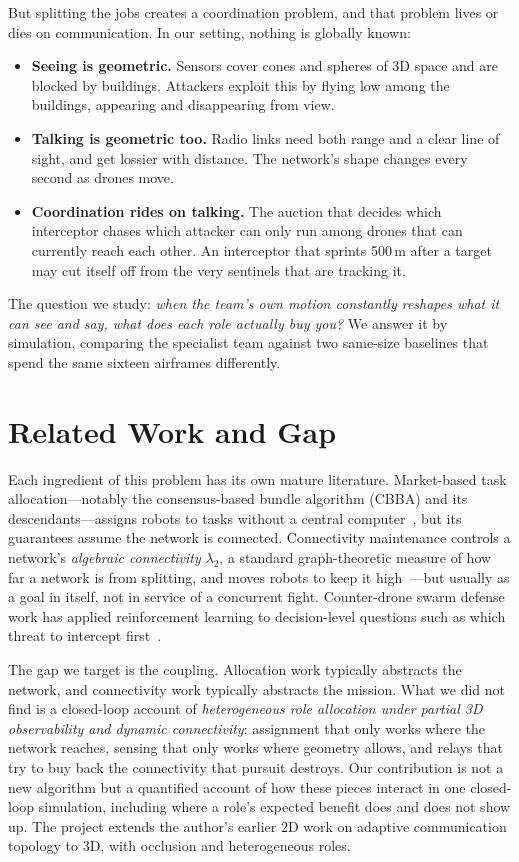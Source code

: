 \documentclass[10pt,twocolumn]{article}
\begin{document}
But splitting the jobs creates a coordination problem, and that problem
lives or dies on communication. In our setting, nothing is globally known:

\begin{itemize}
\item \textbf{Seeing is geometric.} Sensors cover cones and spheres of 3D
space and are blocked by buildings. Attackers exploit this by flying low
among the buildings, appearing and disappearing from view.
\item \textbf{Talking is geometric too.} Radio links need both range and a
clear line of sight, and get lossier with distance. The network's shape
changes every second as drones move.
\item \textbf{Coordination rides on talking.} The auction that decides which
interceptor chases which attacker can only run among drones that can
currently reach each other. An interceptor that sprints 500\,m after a
target may cut itself off from the very sentinels that are tracking it.
\end{itemize}

The question we study: \emph{when the team's own motion constantly reshapes
what it can see and say, what does each role actually buy you?} We answer it
by simulation, comparing the specialist team against two same-size baselines
that spend the same sixteen airframes differently.

\section{Related Work and Gap}
Each ingredient of this problem has its own mature literature. Market-based
task allocation---notably the consensus-based bundle algorithm (CBBA) and
its descendants---assigns robots to tasks without a central
computer~\cite{cbba,mrta_survey}, but its guarantees assume the network is
connected. Connectivity maintenance controls a network's \emph{algebraic
connectivity} $\lambda_2$, a standard graph-theoretic measure of how far a
network is from splitting, and moves robots to keep it
high~\cite{zavlanos,uav_relay_recovery}---but usually as a goal in itself,
not in service of a concurrent fight. Counter-drone swarm defense work has
applied reinforcement learning to decision-level questions such as which
threat to intercept first~\cite{rl_prioritization}.

The gap we target is the coupling. Allocation work typically abstracts the
network, and connectivity work typically abstracts the mission. What we
did not find is a closed-loop account of \emph{heterogeneous role allocation
under partial 3D observability and dynamic connectivity}: assignment that
only works where the network reaches, sensing that only works where
geometry allows, and relays that try to buy back the connectivity that
pursuit destroys. Our contribution is not a new algorithm but a quantified
account of how these pieces interact in one closed-loop simulation,
including where a role's expected benefit does and does not show up. The project extends the author's earlier 2D work
on adaptive communication topology to 3D, with occlusion and heterogeneous
roles.
\end{document}
